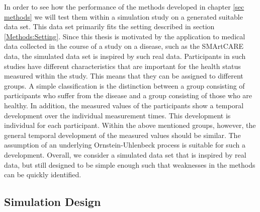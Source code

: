 \documentclass[11pt,titlepage]{article}
\theoremstyle{definition}
\theoremstyle{remark}
\begin{document}
	In order to see how the performance of the methods developed in chapter \ref{sec methods} we will test them within a simulation study on a generated suitable data set. This data set primarily fits the setting described in section \ref{Methods:Setting}. Since this thesis is motivated by the application to medical data collected in the course of a study on a disease, such as the SMArtCARE data, the simulated data set is inspired by such real data. Participants in such studies have different characteristics that are important for the health status measured within the study. This means that they can be assigned to different groups. A simple classification is the distinction between a group consisting of participants who suffer from the disease and a group consisting of those who are healthy. In addition, the measured values of the participants show a temporal development over the individual measurement times. This development is individual for each participant. Within the above mentioned groups, however, the general temporal development of the measured values should be similar. The assumption of an underlying Ornstein-Uhlenbeck process is suitable for such a development. Overall, we consider a simulated data set that is inspired by real data, but still designed to be simple enough such that weaknesses in the methods can be quickly identified.
	
	\subsection{Simulation Design}\label{sec simulation design}
	
\end{document}
